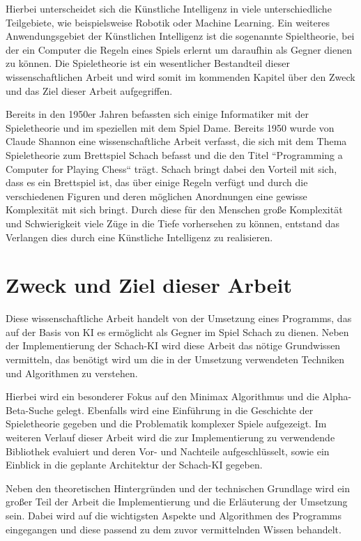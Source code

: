 Hierbei unterscheidet sich die Künstliche Intelligenz in viele unterschiedliche Teilgebiete, wie beispielsweise Robotik oder Machine Learning. Ein weiteres Anwendungsgebiet der Künstlichen Intelligenz ist die sogenannte Spieltheorie, bei der ein Computer die Regeln eines Spiels erlernt um daraufhin als Gegner dienen zu können. Die Spieletheorie ist ein wesentlicher Bestandteil dieser wissenschaftlichen Arbeit und wird somit im kommenden Kapitel über den Zweck und das Ziel dieser Arbeit aufgegriffen.

Bereits in den 1950er Jahren befassten sich einige Informatiker mit der Spieletheorie und im speziellen mit dem Spiel Dame. Bereits 1950 wurde von Claude Shannon eine wissenschaftliche Arbeit verfasst, die sich mit dem Thema Spieletheorie zum Brettspiel Schach befasst und die den Titel ``Programming a Computer for Playing Chess`` trägt.\cite{Shannon1950} Schach bringt dabei den Vorteil mit sich, dass es ein Brettspiel ist, das über einige Regeln verfügt und durch die verschiedenen Figuren und deren möglichen Anordnungen eine gewisse Komplexität mit sich bringt. Durch diese für den Menschen große Komplexität und Schwierigkeit viele Züge in die Tiefe vorhersehen zu können, entstand das Verlangen dies durch eine Künstliche Intelligenz zu realisieren.


\section{Zweck und Ziel dieser Arbeit}\label{zweck_und_ziel}
Diese wissenschaftliche Arbeit handelt von der Umsetzung eines Programms, das auf der Basis von KI es ermöglicht als Gegner im Spiel Schach zu dienen. Neben der Implementierung der Schach-KI wird diese Arbeit das nötige Grundwissen vermitteln, das benötigt wird um die in der Umsetzung verwendeten Techniken und Algorithmen zu verstehen. 

Hierbei wird ein besonderer Fokus auf den Minimax Algorithmus und die Alpha-Beta-Suche gelegt. Ebenfalls wird eine Einführung in die Geschichte der Spieletheorie gegeben und die Problematik komplexer Spiele aufgezeigt. Im weiteren Verlauf dieser Arbeit wird die zur Implementierung zu verwendende Bibliothek evaluiert und deren Vor- und Nachteile aufgeschlüsselt, sowie ein Einblick in die geplante Architektur der Schach-KI gegeben.

Neben den theoretischen Hintergründen und der technischen Grundlage wird ein großer Teil der Arbeit die Implementierung und die Erläuterung der Umsetzung sein. Dabei wird auf die wichtigsten Aspekte und Algorithmen des Programms eingegangen und diese passend zu dem zuvor vermittelnden Wissen behandelt. 

